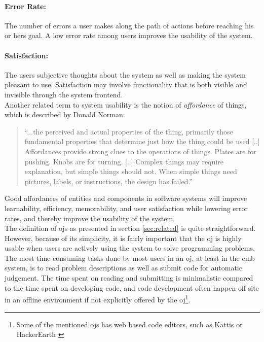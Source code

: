 \paragraph*{Error Rate:} The number of errors a user makes along the path of actions before reaching his or hers goal. A low error rate among users improves the usability of the system.

\paragraph*{Satisfaction:} The users subjective thoughts about the system as well as making the system pleasant to use. Satisfaction may involve functionality that is both visible and invisible through the system frontend.\\

Another related term to system usability is the notion of \textit{affordance} of things, which is described by Donald Norman:
\blockquote{``...the perceived and actual properties of the thing, primarily those fundamental properties that determine just how the thing could be used [..] Affordances provide strong clues to the operations of things. Plates are for pushing. Knobs are for turning. [..] Complex things may require explanation, but simple things should not. When simple things need pictures, labels, or instructions, the design has failed.''  \cite{norman1988design}}

Good affordances of entities and components in software systems will improve learnability, efficiency, memorability, and user satisfaction while lowering error rates, and thereby improve the usability of the system. \\

The definition of \glspl{oj} as presented in section \ref{sec:related} is quite straightforward. However, because of its simplicity, it is fairly important that the \gls{oj} is highly usable when users are actively using the system to solve programming problems. The most time-consuming tasks done by most users in an \gls{oj}, at least in the \gls{cmb} system, is to read problem descriptions as well as submit code for automatic judgement. The time spent on reading and submitting is minimalistic compared to the time spent on developing code, and code development often happen off site in an offline environment if not explicitly offered by the \gls{oj}\footnote{Some of the mentioned \glspl{oj} has web based code editors, such as Kattis \cite{KATTIS} or HackerEarth \cite{HACKEREARTH}}. \\

